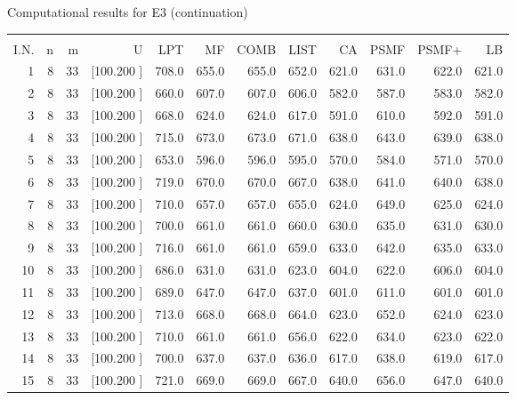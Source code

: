 \documentclass[12pt,a4paper]{article}
\begin{document}
\newpage
\begin{center}
 Computational results for E3 (continuation) {\tiny
\begin{tabular}{r r r r r r r r r r r r}\hline
    &   &   &          &        &        &        &        &        &        &        &       \\[-0.1in]
  I.N.  &  n  &  m  &  U  &  LPT  &  MF  &  COMB  &  LIST  &  CA  & PSMF &PSMF+ & LB \\[0.03in]
\hline
   1&  8& 33&[100.200   ]&   708.0&   655.0&   655.0&   652.0&   621.0&   631.0&   622.0&   621.0\\[-0.02in]
   2&  8& 33&[100.200   ]&   660.0&   607.0&   607.0&   606.0&   582.0&   587.0&   583.0&   582.0\\[-0.02in]
   3&  8& 33&[100.200   ]&   668.0&   624.0&   624.0&   617.0&   591.0&   610.0&   592.0&   591.0\\[-0.02in]
   4&  8& 33&[100.200   ]&   715.0&   673.0&   673.0&   671.0&   638.0&   643.0&   639.0&   638.0\\[-0.02in]
   5&  8& 33&[100.200   ]&   653.0&   596.0&   596.0&   595.0&   570.0&   584.0&   571.0&   570.0\\[-0.02in]
   6&  8& 33&[100.200   ]&   719.0&   670.0&   670.0&   667.0&   638.0&   641.0&   640.0&   638.0\\[-0.02in]
   7&  8& 33&[100.200   ]&   710.0&   657.0&   657.0&   655.0&   624.0&   649.0&   625.0&   624.0\\[-0.02in]
   8&  8& 33&[100.200   ]&   700.0&   661.0&   661.0&   660.0&   630.0&   635.0&   631.0&   630.0\\[-0.02in]
   9&  8& 33&[100.200   ]&   716.0&   661.0&   661.0&   659.0&   633.0&   642.0&   635.0&   633.0\\[-0.02in]
  10&  8& 33&[100.200   ]&   686.0&   631.0&   631.0&   623.0&   604.0&   622.0&   606.0&   604.0\\[-0.02in]
  11&  8& 33&[100.200   ]&   689.0&   647.0&   647.0&   637.0&   601.0&   611.0&   601.0&   601.0\\[-0.02in]
  12&  8& 33&[100.200   ]&   713.0&   668.0&   668.0&   664.0&   623.0&   652.0&   624.0&   623.0\\[-0.02in]
  13&  8& 33&[100.200   ]&   710.0&   661.0&   661.0&   656.0&   622.0&   634.0&   623.0&   622.0\\[-0.02in]
  14&  8& 33&[100.200   ]&   700.0&   637.0&   637.0&   636.0&   617.0&   638.0&   619.0&   617.0\\[-0.02in]
  15&  8& 33&[100.200   ]&   721.0&   669.0&   669.0&   667.0&   640.0&   656.0&   647.0&   640.0\\[-0.02in]

\end{tabular}}
\end{center}
\end{document}
